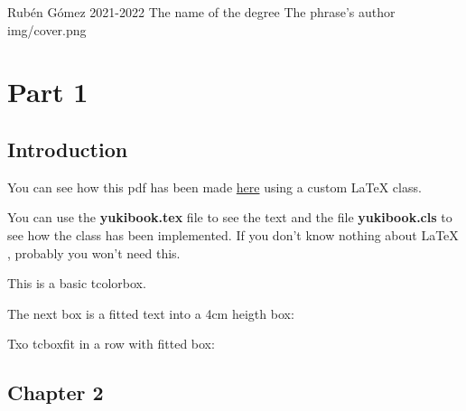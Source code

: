 \documentclass{yukibook}
\begin{document}
  {Rubén Gómez}  %
  {2021-2022}    %
  {The name \linebreak of the degree} %
  {}	%
  {The phrase's author}	%
  {img/cover.png}


\part{Part 1}

\chapter{Introduction}
You can see how this pdf has been made \href{https://github.com/yuki/yukibook.cls}{here} using a custom \LaTeX{}  class.

You can use the \textbf{yukibook.tex} file to see the text and the file \textbf{yukibook.cls} to see how the class has been implemented. If you don't know nothing about \LaTeX{} , probably you won't need this.



\begin{tcolorbox}
This is a basic tcolorbox.

\Blindtext[1]
\end{tcolorbox}

\begin{tcolorbox}[title=Tcolorbox with title]
\Blindtext[1]
\end{tcolorbox}

The next box is a fitted text into a 4cm heigth box:


Txo tcboxfit in a row with fitted box:
\begin{tcbraster}[colback=green!10!white,boxsep=1mm]
\tcboxfit[height=4cm]{\Blindtext[1]}
\tcboxfit[height=4cm]{\Blindtext[1]}
\end{tcbraster}



\Blindtext[1]

\chapter{Chapter 2}
\Blindtext[1]
\end{document}
